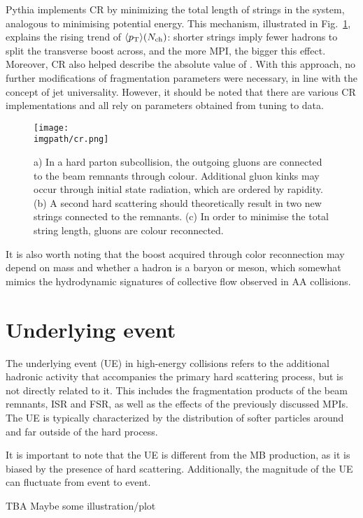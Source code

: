 Pythia implements CR by minimizing the total length of strings in the system, analogous to minimising potential energy. This mechanism, illustrated in Fig.~\ref{fig:intro:cr}, explains the rising trend of $\langle p_{\text{T}} \rangle(N_{\text{ch}})$: shorter strings imply fewer hadrons to split the transverse boost across, and the more MPI, the bigger this effect. Moreover, CR also helped describe the absolute value of \meanpt. With this approach, no further modifications of fragmentation parameters were necessary, in line with the concept of jet universality. However, it should be noted that there are various CR implementations and all rely on parameters obtained from tuning to data.

\begin{figure}[H]
\texttt{[image: \\imgpath/cr.png]}
\caption{a) In a hard parton subcollision, the outgoing gluons are connected to the beam remnants through colour. Additional gluon kinks may occur through initial state radiation, which are ordered by rapidity. (b) A second hard scattering should theoretically result in two new strings connected to the remnants. (c) In order to minimise the total string length, gluons are colour reconnected.}
\label{fig:intro:cr}
\end{figure}

It is also worth noting that the \pt boost acquired through color reconnection may depend on mass and whether a hadron is a baryon or meson, which somewhat mimics the hydrodynamic signatures of collective flow observed in AA collisions.

\section{Underlying event}

The underlying event (UE) in high-energy collisions refers to the additional hadronic activity that accompanies the primary hard scattering process, but is not directly related to it. This includes the fragmentation products of the beam remnants, ISR and FSR, as well as the effects of the previously discussed MPIs. The UE is typically characterized by the distribution of softer particles around and far outside of the hard process.

It is important to note that the UE is different from the MB production, as it is biased by the presence of hard scattering. Additionally, the magnitude of the UE can fluctuate from event to event.

TBA Maybe some illustration/plot

